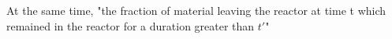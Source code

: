 At the same time, "the fraction of material leaving the reactor at time t which remained in the reactor for a duration greater than $t'$"  